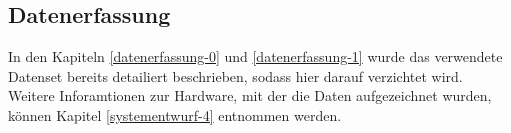\subsection{Datenerfassung} \label{datenerfassung-4}


In den Kapiteln \ref{datenerfassung-0} und \ref{datenerfassung-1} wurde das verwendete Datenset bereits detailiert beschrieben, sodass hier darauf verzichtet wird. Weitere Inforamtionen zur Hardware, mit der die Daten aufgezeichnet wurden, können Kapitel \ref{systementwurf-4} entnommen werden. \\